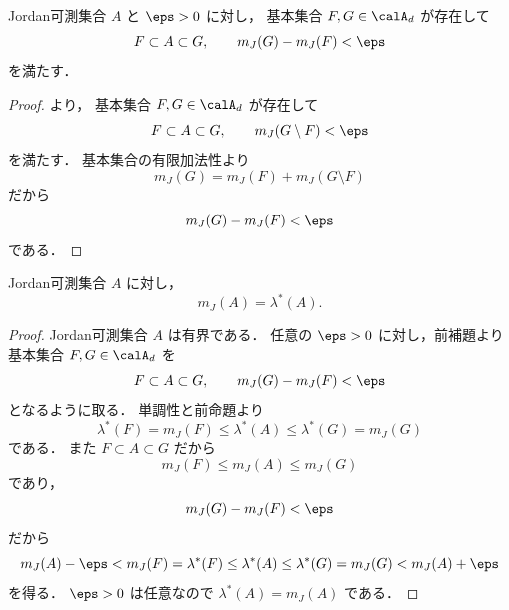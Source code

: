 
\begin{lemma}[Jordan可測集合の基本集合近似]
Jordan可測集合 $A$ と $\eps>0$ に対し，
基本集合 $F,G \in \calA_d$ が存在して
\[
F \subset A \subset G,
\qquad
m_J(G)-m_J(F)<\eps
\]
を満たす．
\end{lemma}

\begin{proof}
より，
基本集合 $F,G \in \calA_d$ が存在して
\[
F \subset A \subset G,
\qquad
m_J(G\setminus F)<\eps
\]
を満たす．
基本集合の有限加法性より
\[
m_J(G)=m_J(F)+m_J(G\setminus F)
\]
だから
\[
m_J(G)-m_J(F)<\eps
\]
である．
\end{proof}

\begin{theorem}
    Jordan可測集合 $A$ に対し，
    \[
    m_J(A) = \lambda^*(A).
    \]
\end{theorem}

\begin{proof}
Jordan可測集合 $A$ は有界である．
任意の $\eps > 0$ に対し，前補題より
基本集合 $F,G \in \calA_d$ を
\[
F \subset A \subset G,
\qquad
m_J(G)-m_J(F)<\eps
\]
となるように取る．
単調性と前命題より
\[
\lambda^*(F)=m_J(F)\le \lambda^*(A)\le \lambda^*(G)=m_J(G)
\]
である．
また $F \subset A \subset G$ だから
\[
m_J(F)\le m_J(A)\le m_J(G)
\]
であり，
\[
m_J(G)-m_J(F)<\eps
\]
だから
\[
m_J(A)-\eps < m_J(F)=\lambda^*(F)
\le
\lambda^*(A)
\le
\lambda^*(G)=m_J(G)
< m_J(A)+\eps
\]
を得る．
$\eps > 0$ は任意なので $\lambda^*(A)=m_J(A)$ である．
\end{proof}
